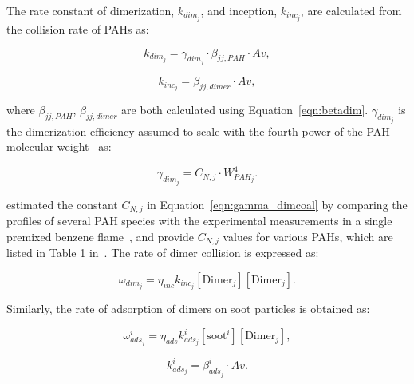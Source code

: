 The rate constant of dimerization, ${k_{dim_{j}}}$, and inception, ${k_{inc_{j}}}$, are calculated from the collision rate of PAHs as:

\begin{equation}
	k_{dim_{j}}=
	\gamma_{dim_j}\cdot\beta_{jj,PAH}\cdot Av
	\label{eqn:kdim_dimcoal},
\end{equation}

\begin{equation}
	k_{inc_{j}}=
	\beta_{jj,dimer}\cdot Av
	\label{eqn:kinc_dimcoal},
\end{equation}

\noindent where $\beta_{jj,PAH}$, $\beta_{jj,dimer}$ are both calculated using Equation~\eqref{eqn:betadim}. $\gamma_{dim_j}$ is the dimerization efficiency assumed to scale with the fourth power of the PAH molecular weight~\cite{blanquart2009analyzing} as:

\begin{equation}
	\gamma_{dim_j}=
	C_{N,j}\cdot W_{PAH_j}^4.
	\label{eqn:gamma_dimcoal}
\end{equation} 

\citet{blanquart2009joint} estimated the constant ${C_{N,j}}$ in Equation~\eqref{eqn:gamma_dimcoal} by comparing the profiles of several PAH species with the experimental measurements in a single premixed benzene flame~\citep{tregrossi1999combustion}, and provide ${C_{N,j}}$ values for various PAHs, which are listed in Table 1 in~\citep{blanquart2009analyzing}. The rate of dimer collision is expressed as:

\begin{equation}
	\omega_{dim_j} = \eta_{inc} k_{inc_{j}} [\mathrm{Dimer}_j] [\mathrm{Dimer}_j].
	\label{eqn:wdim_dimcoal}
\end{equation}


Similarly, the rate of adsorption of dimers on soot particles is obtained as:

\begin{equation}
	\omega^i_{ads_j} = \eta_{ads} k^i_{ads_{j}} [\mathrm{soot}^i] [\mathrm{Dimer}_j],
\end{equation}

\begin{equation}
	k^i_{ads_{j}}=
	\beta^i_{ads_j}\cdot Av.
	\label{eqn:kads_dimcoal}
\end{equation}

